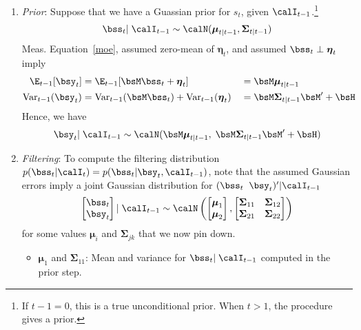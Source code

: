 \documentclass[12pt]{article}
\theoremstyle{plain}
\theoremstyle{definition}
\theoremstyle{remark}
\newcommand{\bseta}{\boldsymbol{\eta}}
\newcommand{\bsmu}{\boldsymbol{\mu}}
\newcommand{\bsSigma}{\boldsymbol{\Sigma}}
\newcommand{\Var}{\operatorname{Var}}
\begin{document}
\begin{enumerate}
  \item \emph{Prior}: Suppose that we have a Guassian prior for $s_t$,
    given $\calI_{t-1}$.\footnote{%
      If $t-1=0$, this is a true unconditional prior.  When $t>1$, the
      procedure gives a prior.
    }
    \begin{align*}
      \bss_t | \; \calI_{t-1}
      \sim \calN(\bsmu_{t|t-1}, \bsSigma_{t|t-1})
    \end{align*}
    Meas. Equation~\ref{moe}, assumed zero-mean of $\bseta_t$, and
    assumed $\bss_t\perp\bseta_t$ imply
    \begin{alignat*}{3}
        \E_{t-1}[\bsy_t ] &=
        \E_{t-1}[\bsM\bss_t + \bseta_t ]
        &&= \bsM\bsmu_{t|t-1}
        \\
        \Var_{t-1}(\bsy_t)
        &= \Var_{t-1}(\bsM\bss_t)
        + \Var_{t-1}(\bseta_t)
        &&= \bsM\bsSigma_{t|t-1} \bsM' + \bsH
    \end{alignat*}
    Hence, we have
    \begin{align*}
      \bsy_t | \; \calI_{t-1}
      \sim \calN(\bsM\bsmu_{t|t-1}, \;\bsM\bsSigma_{t|t-1}\bsM'+\bsH)
    \end{align*}

  \item \emph{Filtering}:
    To compute the filtering distribution
    $p(\bss_t|\calI_{t})=p(\bss_t|\bsy_t, \calI_{t-1})$,
    note that the assumed Gaussian errors
    imply a joint Gaussian distribution for
    $(\bss_t\;\;\bsy_t)'|\calI_{t-1}$
    \begin{align*}
      \begin{bmatrix} \bss_t \\ \bsy_t \end{bmatrix} | \;
      \calI_{t-1}
      \sim
      \calN\left(
        \begin{bmatrix}
          \bsmu_1 \\ \bsmu_2
        \end{bmatrix},
        \begin{bmatrix}
          \bsSigma_{11} & \bsSigma_{12} \\
          \bsSigma_{21} & \bsSigma_{22}
        \end{bmatrix}
      \right)
    \end{align*}
    for some values $\bsmu_{i}$ and $\bsSigma_{jk}$ that we now pin
    down.
    \begin{itemize}
      \item $\bsmu_1$ and $\bsSigma_{11}$:
        Mean and variance for $\bss_t |\; \calI_{t-1}$ computed in the
        prior step.


\end{itemize}
\end{enumerate}
\end{document}

